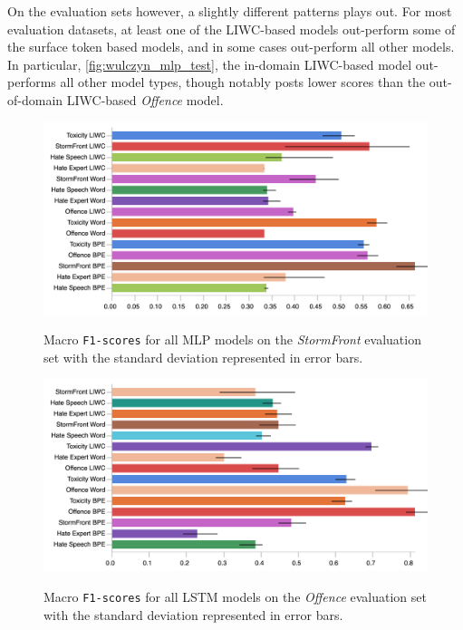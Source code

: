 On the evaluation sets however, a slightly different patterns plays out. 
For most evaluation datasets, at least one of the LIWC-based models out-perform some of the surface token based models, and in some cases out-perform all other models. 
In particular, \cref{fig:wulczyn_mlp_test}, the in-domain LIWC-based model out-performs all other model types, though notably posts lower scores than the out-of-domain LIWC-based \textit{Offence} model.

\begin{figure}
\begin{minipage}{\textwidth}
\centering
  \includegraphics[width=\textwidth]{all_mlp_garcia_test.pdf}
  \caption{Macro \texttt{F1-scores} for all MLP models on the \textit{StormFront} evaluation set with the standard deviation represented in error bars.}
  \label{fig:garcia_mlp_test}
  \vfill
    \includegraphics[width=\textwidth]{all_lstm_davidson_test.pdf}
    \caption{Macro \texttt{F1-scores} for all LSTM models on the \textit{Offence} evaluation set with the standard deviation represented in error bars.}
    \label{fig:davidson_lstm_test}
  \end{minipage}
\end{figure}

